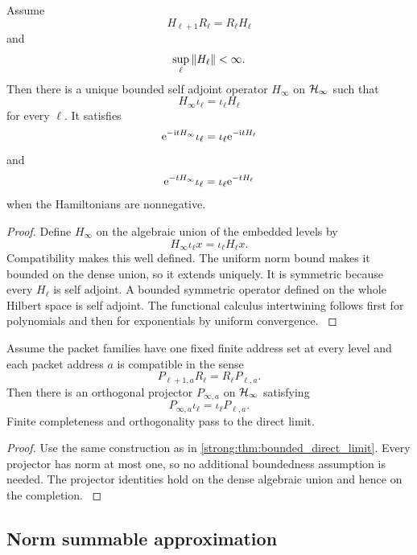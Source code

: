 \begin{theorem}\label{strong:theorem:045}\label{strong:thm:bounded_direct_limit}
Assume
\[
H_{\ell+1}R_\ell=R_\ell H_\ell
\]
and
\[
\sup_\ell\left\lVert H_\ell\right\rVert<\infty.
\]
Then there is a unique bounded self adjoint operator \(H_\infty\) on \(\mathcal H_\infty\) such that
\[
H_\infty\iota_\ell=\iota_\ell H_\ell
\]
for every \(\ell\). It satisfies
\[
\mathrm e^{-\mathrm i tH_\infty}\iota_\ell
=
\iota_\ell\mathrm e^{-\mathrm i tH_\ell}
\]
and
\[
\mathrm e^{-tH_\infty}\iota_\ell
=
\iota_\ell\mathrm e^{-tH_\ell}
\]
when the Hamiltonians are nonnegative.
\end{theorem}

\begin{proof}\label{strong:proof:073}
Define \(H_\infty\) on the algebraic union of the embedded levels by
\[
H_\infty\iota_\ell x=\iota_\ell H_\ell x.
\]
Compatibility makes this well defined. The uniform norm bound makes it bounded on the dense union, so it extends uniquely. It is symmetric because every \(H_\ell\) is self adjoint. A bounded symmetric operator defined on the whole Hilbert space is self adjoint. The functional calculus intertwining follows first for polynomials and then for exponentials by uniform convergence.
\label{strong:proof:073:end}\end{proof}

\begin{theorem}\label{strong:theorem:046}\label{strong:thm:packet_direct_limit}
Assume the packet families have one fixed finite address set at every level and each packet address \(a\) is compatible in the sense
\[
P_{\ell+1,a}R_\ell=R_\ell P_{\ell,a}.
\]
Then there is an orthogonal projector \(P_{\infty,a}\) on \(\mathcal H_\infty\) satisfying
\[
P_{\infty,a}\iota_\ell=\iota_\ell P_{\ell,a}.
\]
Finite completeness and orthogonality pass to the direct limit.
\end{theorem}

\begin{proof}\label{strong:proof:074}
Use the same construction as in \cref{strong:thm:bounded_direct_limit}. Every projector has norm at most one, so no additional boundedness assumption is needed. The projector identities hold on the dense algebraic union and hence on the completion.
\label{strong:proof:074:end}\end{proof}

\subsection{Norm summable approximation}\label{strong:subsec:norm_summable}

